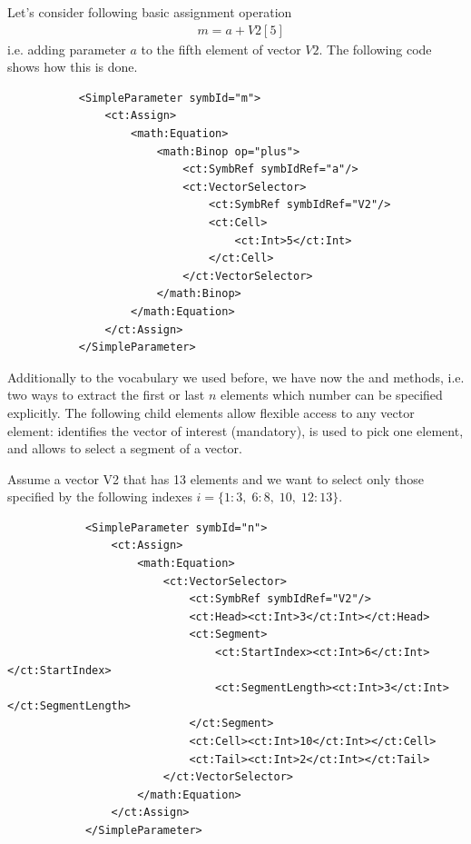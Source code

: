 Let's consider following basic assignment operation
\begin{align}
	& m = a + V2[5] \nonumber
\end{align}
i.e. adding parameter $a$ to the fifth element of vector $V2$. 
The following code shows how this is done. 

\lstset{language=XML}
\begin{lstlisting}
           <SimpleParameter symbId="m">
               <ct:Assign>
                   <math:Equation>
                       <math:Binop op="plus">
                           <ct:SymbRef symbIdRef="a"/>
                           <ct:VectorSelector>
                               <ct:SymbRef symbIdRef="V2"/>
                               <ct:Cell>
                                   <ct:Int>5</ct:Int>
                               </ct:Cell>
                           </ct:VectorSelector>
                       </math:Binop>
                   </math:Equation>
               </ct:Assign>
           </SimpleParameter>
\end{lstlisting}

Additionally to the vocabulary we used before, we have now the  and  
methods, i.e. two ways to extract the first or last $n$ elements which number can be specified
explicitly. The following child elements allow flexible access to any vector element: 
 identifies the vector of interest (mandatory), 
 is used to pick one element, and
 allows to select a segment of a vector.


Assume a vector V2 that has 13 elements and we want to select only those specified by the
following indexes $i=\{1:3,\;6:8,\;10,\;12:13\}.$
\lstset{language=XML}
\begin{lstlisting}
            <SimpleParameter symbId="n">
                <ct:Assign>
                    <math:Equation>
                        <ct:VectorSelector>
                            <ct:SymbRef symbIdRef="V2"/>
                            <ct:Head><ct:Int>3</ct:Int></ct:Head>
                            <ct:Segment>
                                <ct:StartIndex><ct:Int>6</ct:Int></ct:StartIndex>
                                <ct:SegmentLength><ct:Int>3</ct:Int></ct:SegmentLength>
                            </ct:Segment>
                            <ct:Cell><ct:Int>10</ct:Int></ct:Cell>
                            <ct:Tail><ct:Int>2</ct:Int></ct:Tail>
                        </ct:VectorSelector>
                    </math:Equation>
                </ct:Assign>
            </SimpleParameter>
\end{lstlisting}


